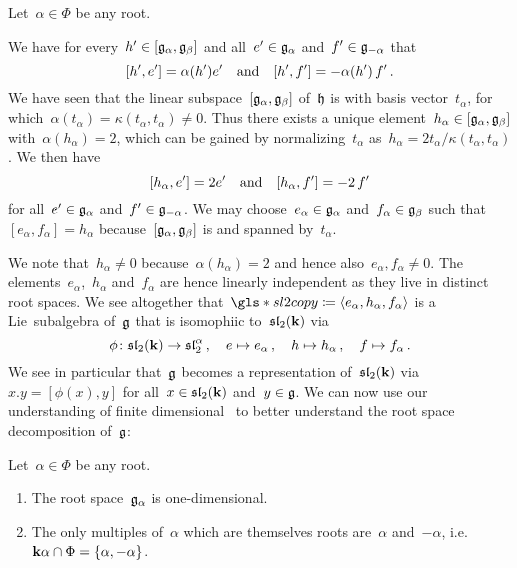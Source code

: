 \begin{construction}
  \label{construction of S alpha}
    Let~$\alpha \in \Phi$ be any root.
    
    We have for every~$h' \in [\mathfrak{g}_\alpha, \mathfrak{g}_\beta]$ and all~$e' \in \mathfrak{g}_\alpha$ and~$f' \in \mathfrak{g}_{-\alpha}$ that
    \[
      [h', e']
      =
      \alpha(h') e'
      \quad\text{and}\quad
      [h', f']
      =
      -\alpha(h') \, f'  \,.
    \]
    We have seen that the linear subspace~$[\mathfrak{g}_\alpha, \mathfrak{g}_\beta]$ of~$\mathfrak{h}$ is {\onedimensional} with basis vector~$t_\alpha$, for which~$\alpha(t_\alpha) = \kappa(t_\alpha, t_\alpha) \neq 0$.
    Thus there exists a unique element~$h_\alpha \in [\mathfrak{g}_\alpha, \mathfrak{g}_\beta]$ with~$\alpha(h_\alpha) = 2$, which can be gained by normalizing~$t_\alpha$ as~$h_\alpha = 2 t_\alpha / \kappa(t_\alpha, t_\alpha)$.
    We then have
    \[
      [h_\alpha, e']
      =
      2 e'
      \quad\text{and}\quad
      [h_\alpha, f']
      =
      -2 \, f'
    \]
    for all~$e' \in \mathfrak{g}_\alpha$ and~$f' \in \mathfrak{g}_{-\alpha}$.
    We may choose~$e_\alpha \in \mathfrak{g}_\alpha$ and~$f_\alpha \in \mathfrak{g}_\beta$ such that~$[e_\alpha, f_\alpha] = h_\alpha$ because~$[\mathfrak{g}_\alpha, \mathfrak{g}_\beta]$ is {\onedimensional} and spanned by~$t_\alpha$.
    
    We note that~$h_\alpha \neq 0$ because~$\alpha(h_\alpha) = 2$ and hence also~$e_\alpha, f_\alpha \neq 0$.
    The elements~$e_\alpha$,~$h_\alpha$ and~$f_\alpha$ are hence linearly independent as they live in distinct root spaces.
    We see altogether that~$\gls*{sl2 copy} \defined \gen{e_\alpha, h_\alpha, f_\alpha}$ is a {\threedimensional} Lie~subalgebra of~$\mathfrak{g}$ that is isomophiic to~$\mathfrak{sl}_2(\mathbf{k})$ via
    \[
      \phi
      \colon
      \mathfrak{sl}_2(\mathbf{k})
      \to
      \mathfrak{sl}_2^\alpha \,,
      \quad
      e
      \mapsto
      e_\alpha  \,,
      \quad
      h
      \mapsto
      h_\alpha  \,,
      \quad
      f
      \mapsto
      f_\alpha  \,.
    \]
    We see in particular that~$\mathfrak{g}$ becomes a representation of~$\mathfrak{sl}_2(\mathbf{k})$ via~$x.y = [\phi(x), y]$ for all~$x \in \mathfrak{sl}_2(\mathbf{k})$ and~$y \in \mathfrak{g}$.
    We can now use our understanding of finite dimensional~{} to better understand the root space decomposition of~$\mathfrak{g}$:
\end{construction}


\begin{proposition}
  \label{roots spaces are onedimensional and reduced}
  Let~$\alpha \in \Phi$ be any root.
  \begin{enumerate}
    \item
      The root space~$\mathfrak{g}_\alpha$ is one-dimensional.
    \item
      The only multiples of~$\alpha$ which are themselves roots are~$\alpha$ and~$-\alpha$, i.e.~$\mathbf{k} \alpha \cap \Phi = \{\alpha, -\alpha\}$.
  \end{enumerate}
\end{proposition}


